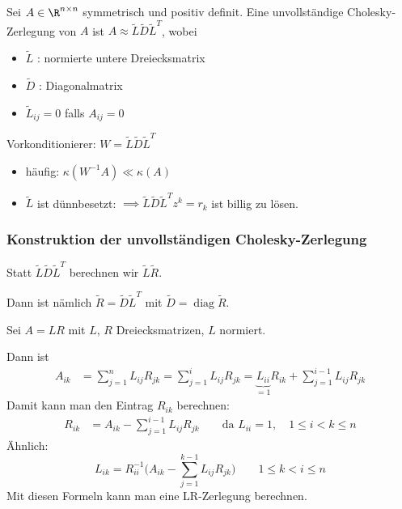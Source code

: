 \begin{defi}
Sei $A \in \R^{n \times n}$ symmetrisch und positiv definit. Eine unvollständige Cholesky-Zerlegung von $A$ ist
$A \approx \tilde{L} \tilde{D} \tilde{L}^T$, wobei
\begin{itemize}
 \item $\tilde{L}$ : normierte untere Dreiecksmatrix
 \item $\tilde{D}$ : Diagonalmatrix
 \item $\tilde{L}_{ij}=0$ falls $A_{ij}=0$
\end{itemize}
\end{defi}

\bigskip

Vorkonditionierer: $W=\tilde{L} \tilde{D} \tilde{L}^T$
\begin{itemize}
 \item häufig: $\kappa \left(W^{-1}A \right) \ll \kappa (A)$
 \item $\tilde{L}$ ist dünnbesetzt: $\implies \tilde{L} \tilde{D} \tilde{L}^Tz^k=r_k$ ist billig zu lösen.
\end{itemize}


\subsubsection{Konstruktion der unvollständigen Cholesky-Zerlegung}

Statt $\tilde{L} \tilde{D} \tilde{L}^T$ berechnen wir $\tilde{L} \tilde{R}$.

\smallskip

Dann ist nämlich $\tilde{R} = \tilde{D} \tilde{L}^T$ mit $\tilde{D} = \operatorname{diag} \tilde{R}$.

\bigskip

Sei $A=LR$ mit $L$, $R$ Dreiecksmatrizen, $L$ normiert.

Dann ist
\begin{align*}
 A_{ik} & =\sum_{j=1}^n L_{ij}R_{jk}
    = \sum_{j=1}^i L_{ij}R_{jk}
    = \underbrace{L_{ii}}_{=1} R_{ik}+\sum_{j=1}^{i-1} L_{ij}R_{jk}
\end{align*}
Damit kann man den Eintrag $R_{ik}$ berechnen:
\begin{align*}
 R_{ik} & =A_{ik}-\sum_{j=1}^{i-1} L_{ij}R_{jk}
 \qquad
 \text{da $L_{ii}= 1$}, \quad
 1 \leq i<k \leq n
\end{align*}
Ähnlich:
\begin{equation*}
 L_{ik}=R_{ii}^{-1} \Big(A_{ik}-\sum_{j=1}^{k-1} L_{ij}R_{jk} \Big)
 \qquad 1 \leq k<i \leq n
\end{equation*}
Mit diesen Formeln kann man eine LR-Zerlegung berechnen.

